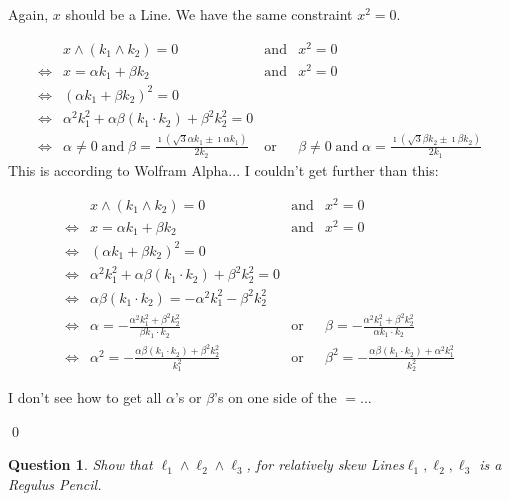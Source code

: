 \documentclass[a4paper,11pt,twoside,openright]{article}
\newcommand{\textgt}[1]{\textsf{#1}\xspace}
\newcommand{\pLine}{\textgt{Line}}
\newcommand{\pLines}{\textgt{Lines}}
\newcommand{\pRegPen}{\textgt{Regulus Pencil}}
\newcommand{\en}{\ensuremath{\mathbin{\mbox{and}}}}
\newcommand{\of}{\ensuremath{\mathbin{\mbox{or}}}}
\newcommand{\eql}{\ensuremath{\Leftrightarrow}}
\newtheorem{question}{Question}
\begin{document}
\begin{enumerate}
Again, $x$ should be a \pLine.  We have the same constraint $x^2 = 0$.

\[
\begin{array}{rlcl}
 & x \wedge (k_1 \wedge k_2) = 0 &\en& x^2 = 0 \\
\eql& x = \alpha k_1 + \beta k_2 &\en& x^2 = 0 \\
\eql& \left(\alpha k_1 + \beta k_2\right)^2 = 0 \\
\eql& \alpha^2 k_1^2 + \alpha \beta (k_1 \cdot k_2) + \beta^2 k_2^2 = 0 \\
\eql& \alpha \not= 0 \en \beta = \frac{\imath \left( \sqrt{3} \alpha k_1 \pm \imath \alpha k_1\right)}{2k_2} &\of& \beta \not= 0 \en \alpha = \frac{\imath \left( \sqrt{3} \beta k_2 \pm \imath \beta k_2\right)}{2k_1}
\end{array}
\]
This is according to Wolfram Alpha... I couldn't get further than this:

\[
\begin{array}{rlcl}
 & x \wedge (k_1 \wedge k_2) = 0 &\en& x^2 = 0 \\
\eql& x = \alpha k_1 + \beta k_2 &\en& x^2 = 0 \\
\eql& \left(\alpha k_1 + \beta k_2\right)^2 = 0 \\
\eql& \alpha^2 k_1^2 + \alpha \beta (k_1 \cdot k_2) + \beta^2 k_2^2 = 0 \\
\eql& \alpha \beta (k_1 \cdot k_2) = -\alpha^2 k_1^2 - \beta^2 k_2^2 \\
\eql& \alpha = - \frac{\alpha^2 k_1^2 + \beta^2 k_2^2}{\beta k_1 \cdot k_2} &\of& \beta = - \frac{\alpha^2 k_1^2 + \beta^2 k_2^2}{\alpha k_1 \cdot k_2} \\
\eql& \alpha^2 = -\frac{\alpha \beta (k_1 \cdot k_2) + \beta^2 k_2^2}{k_1^2} &\of& \beta^2 = -\frac{\alpha \beta (k_1 \cdot k_2) + \alpha^2 k_1^2}{k_2^2}
\end{array}
\]

I don't see how to get all $\alpha$'s or $\beta$'s on one side of the $=$...
\end{enumerate}
\qed

\begin{question}
Show that $\ell_1 \wedge \ell_2 \wedge \ell_3$, for relatively skew \pLines $\ell_1, \ell_2, \ell_3$ is a \pRegPen.
\end{question}
\end{document}
